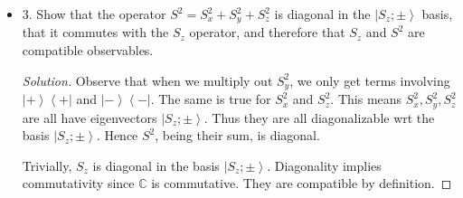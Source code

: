 \begin{itemize}
\item
3. Show that the operator $S^2=S_x^2+S_y^2+S_z^2$ is diagonal in the $\left|S_z ; \pm\right\rangle$ basis, that it commutes with the $S_z$ operator, and therefore that $S_z$ and $S^2$ are compatible observables.
\begin{proof}[Solution]
	Observe that when we multiply out $S_y^2$, we only get terms involving $\left| + \right\rangle \left\langle + \right| $ and $\left| - \right\rangle \left\langle - \right| $. The same is true for $S_x^2$ and $S_z^2$. This means $S_x^2, S_y^2, S_z^2$ are all have eigenvectors $\left| S_z; \pm  \right\rangle $. Thus they are all diagonalizable wrt the basis $\left| S_z; \pm  \right\rangle $. Hence $S^2$, being their sum, is diagonal.

	Trivially, $S_z$ is diagonal in the basis $\left| S_z; \pm  \right\rangle $. Diagonality implies commutativity since $\mathbb{C}$ is commutative. They are compatible by definition.
\end{proof}

\end{itemize}

